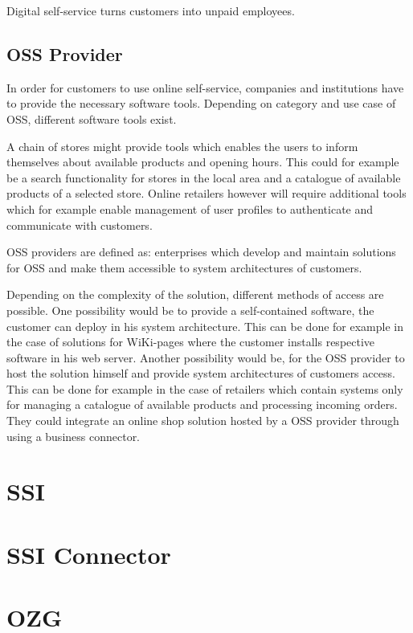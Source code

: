 \documentclass[
     12pt,         %
     a4paper,      %
     BCOR=10mm,version=first,     %
     DIV=14,version=first,        %
     ]{scrreprt}
\begin{document}
Digital self-service turns customers into unpaid employees.

\subsection{OSS Provider}
In order for customers to use online self-service, companies and institutions have to provide the necessary software tools. Depending on category and use case of OSS, different software tools exist.

A chain of stores might provide tools which enables the users to inform themselves about available products and opening hours. This could for example be a search functionality for stores in the local area and a catalogue of available products of a selected store. Online retailers however will require additional tools which for example enable management of user profiles to authenticate and communicate with customers.

OSS providers are defined as: enterprises which develop and maintain solutions for OSS and make them accessible to system architectures of customers. 

Depending on the complexity of the solution, different methods of access are possible. One possibility would be to provide a self-contained software, the customer can deploy in his system architecture. This can be done for example in the case of solutions for WiKi-pages where the customer installs respective software in his web server. Another possibility would be, for the OSS provider to host the solution himself and provide system architectures of customers access. This can be done for example in the case of retailers which contain systems only for managing a catalogue of available products and processing incoming orders. They could integrate an online shop solution hosted by a OSS provider through using a business connector.

\section{SSI}

\section{SSI Connector}

\section{OZG}
\end{document}

